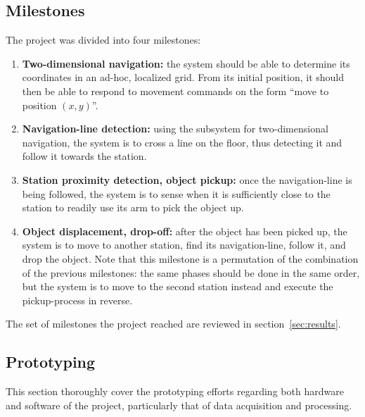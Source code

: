 \subsection{Milestones}
\label{sec:milestones}
The project was divided into four milestones:
\begin{enumerate}
\item \textbf{Two-dimensional navigation:}
  the system should be able to determine its coordinates in an ad-hoc, localized grid.
  From its initial position, it should then be able to respond to movement commands on the form ``move to position $(x, y)$''.

\item \textbf{Navigation-line detection:}
  using the subsystem for two-dimensional navigation, the system is to cross a line on the floor,
  thus detecting it and follow it towards the station.

\item \textbf{Station proximity detection, object pickup:}
  once the navigation-line is being followed, the system is to sense when it is sufficiently close to the station to readily use its arm to pick the object up.

\item \textbf{Object displacement, drop-off:}
  after the object has been picked up, the system is to move to another station, find its navigation-line, follow it, and drop the object.
  Note that this milestone is a permutation of the combination of the previous milestones: the same phases should be done in the same order,
  but the system is to move to the second station instead and execute the pickup-process in reverse.
\end{enumerate}

The set of milestones the project reached are reviewed in section~\ref{sec:results}.

\subsection{Prototyping}
This section thoroughly cover the prototyping efforts regarding both hardware and software of the project,
particularly that of data acquisition and processing.

